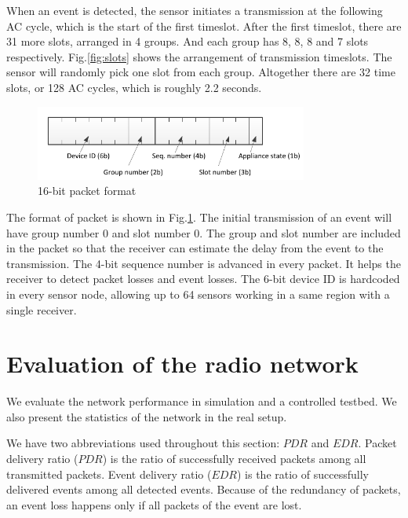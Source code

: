When an event is detected, the sensor initiates a transmission at the following AC cycle, which is the start of the first timeslot. After the first timeslot, there are 31 more slots, arranged in 4 groups. And each group has 8, 8, 8 and 7 slots respectively. Fig.\ref{fig:slots} shows the arrangement of transmission timeslots. The sensor will randomly pick one slot from each group. Altogether there are 32 time slots, or 128 AC cycles, which is roughly 2.2 seconds. 

\begin{figure}[htb]
  \centering
  \includegraphics[width=0.8\textwidth]{figures/packet}
  \caption{16-bit packet format}
  \label{fig:packet}
\end{figure}

The format of packet is shown in Fig.\ref{fig:packet}. The initial transmission of an event will have group number 0 and slot number 0. The group and slot number are included in the packet so that the receiver can estimate the delay from the event to the transmission. The 4-bit sequence number is advanced in every packet. It helps the receiver to detect packet losses and event losses.  The 6-bit device ID is hardcoded in every sensor node, allowing up to 64 sensors working in a same region with a single receiver. 

\section{Evaluation of the radio network}

We evaluate the network performance in simulation and a controlled testbed. We also present the statistics of the network in the real setup. 

We have two abbreviations used throughout this section: $PDR$ and $EDR$. Packet delivery ratio ($PDR$) is the ratio of successfully received packets among all transmitted packets. Event delivery ratio ($EDR$) is the ratio of successfully delivered events among all detected events. Because of the redundancy of packets, an event loss happens only if all packets of the event are lost. 


